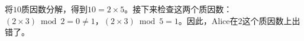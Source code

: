 将$10$质因数分解，得到$10=2\times 5$。接下来检查这两个质因数：$(2\times 3)\bmod 2=0\not=1$，$(2\times 3)\bmod 5=1$。因此，Alice在$2$这个质因数上出错了。